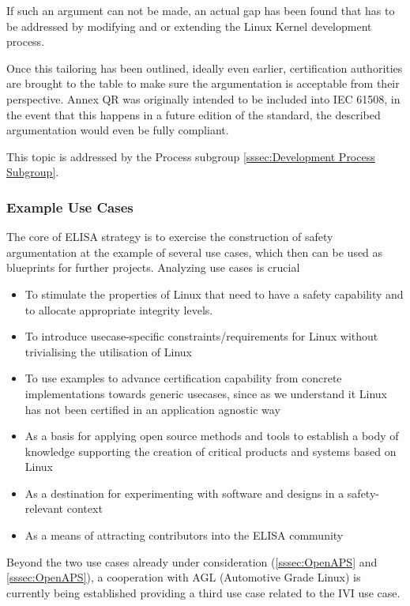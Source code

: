 \documentclass[12pt]{ElisaPaper}
\begin{document}
If such an argument can not be made, an actual gap has been found that has to be addressed by modifying and or extending the Linux Kernel development process.

Once this tailoring has been outlined, ideally even earlier, certification authorities are brought to the table to make sure the argumentation is acceptable from their perspective. 
Annex QR was originally intended to be included into IEC 61508, in the event that this happens in a future edition of the standard, the described argumentation would even be fully compliant.

This topic is addressed by the Process subgroup \ref{sssec:Development Process Subgroup}.
\subsubsection{Example Use Cases}
The core of ELISA strategy is to exercise the construction of safety argumentation at the example of several use cases, which then can be used as blueprints for further projects.
Analyzing use cases is crucial
\begin{itemize}
	\item 
To stimulate the properties of Linux that need to have a safety capability and to allocate appropriate integrity levels.
\item 
To introduce usecase-specific constraints/requirements for Linux without trivialising the utilisation of Linux
\item 
To use examples to advance certification capability from concrete implementations towards generic usecases, since as we understand it Linux has not been certified in an application agnostic way
\item 
As a basis for applying open source methods and tools to establish a body of knowledge supporting the creation of critical products and systems based on Linux
\item 
As a destination for experimenting with software and designs in a safety-relevant context
\item 
As a means of attracting contributors into the ELISA community
\end{itemize}
Beyond the two use cases already under consideration (\ref{sssec:OpenAPS} and \ref{sssec:OpenAPS}), a cooperation with AGL (Automotive Grade Linux) is currently being established providing a third use case related to the IVI use case.

%
%
%
%
%
\end{document}
